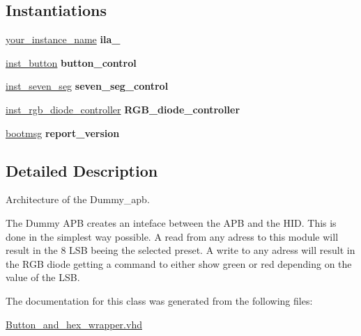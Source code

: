 \subsection*{Instantiations}
 \begin{DoxyCompactItemize}
\item 
\hypertarget{classbutton__and__hex__wrapper_1_1rtl_a0436c260c322f6cee9c77cb502b8d335}{\hyperlink{classbutton__and__hex__wrapper_1_1rtl_a0436c260c322f6cee9c77cb502b8d335}{your\-\_\-instance\-\_\-name}  {\bfseries ila\-\_}   }\label{classbutton__and__hex__wrapper_1_1rtl_a0436c260c322f6cee9c77cb502b8d335}

\item 
\hypertarget{classbutton__and__hex__wrapper_1_1rtl_a065108a7c5c7c769b154fb69388d1a54}{\hyperlink{classbutton__and__hex__wrapper_1_1rtl_a065108a7c5c7c769b154fb69388d1a54}{inst\-\_\-button}  {\bfseries button\-\_\-control}   }\label{classbutton__and__hex__wrapper_1_1rtl_a065108a7c5c7c769b154fb69388d1a54}

\item 
\hypertarget{classbutton__and__hex__wrapper_1_1rtl_a3241459a5ccd9bec9843d574e36baba6}{\hyperlink{classbutton__and__hex__wrapper_1_1rtl_a3241459a5ccd9bec9843d574e36baba6}{inst\-\_\-seven\-\_\-seg}  {\bfseries seven\-\_\-seg\-\_\-control}   }\label{classbutton__and__hex__wrapper_1_1rtl_a3241459a5ccd9bec9843d574e36baba6}

\item 
\hypertarget{classbutton__and__hex__wrapper_1_1rtl_a29c5d24baf8a0a823850fde077cda9f0}{\hyperlink{classbutton__and__hex__wrapper_1_1rtl_a29c5d24baf8a0a823850fde077cda9f0}{inst\-\_\-rgb\-\_\-diode\-\_\-controller}  {\bfseries R\-G\-B\-\_\-diode\-\_\-controller}   }\label{classbutton__and__hex__wrapper_1_1rtl_a29c5d24baf8a0a823850fde077cda9f0}

\item 
\hypertarget{classbutton__and__hex__wrapper_1_1rtl_acc6b2c6c9f85f90e08b01fb364af1a87}{\hyperlink{classbutton__and__hex__wrapper_1_1rtl_acc6b2c6c9f85f90e08b01fb364af1a87}{bootmsg}  {\bfseries report\-\_\-version}   }\label{classbutton__and__hex__wrapper_1_1rtl_acc6b2c6c9f85f90e08b01fb364af1a87}

\end{DoxyCompactItemize}


\subsection{Detailed Description}
Architecture of the Dummy\-\_\-apb. 

The Dummy A\-P\-B creates an inteface between the A\-P\-B and the H\-I\-D. This is done in the simplest way possible. A read from any adress to this module will result in the 8 L\-S\-B beeing the selected preset. A write to any adress will result in the R\-G\-B diode getting a command to either show green or red depending on the value of the L\-S\-B. 

The documentation for this class was generated from the following files\-:\begin{DoxyCompactItemize}
\item 
\hyperlink{Button__and__hex__wrapper_8vhd}{Button\-\_\-and\-\_\-hex\-\_\-wrapper.\-vhd}\end{DoxyCompactItemize}
